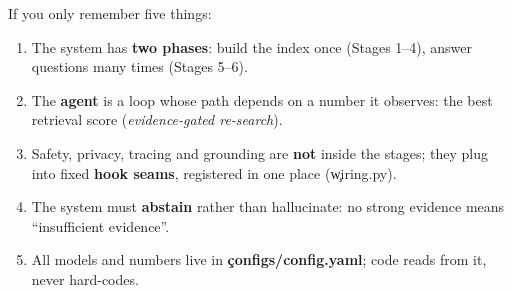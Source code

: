 \begin{keyidea}
If you only remember five things:
\begin{enumerate}
 \item The system has \textbf{two phases}: build the index once (Stages 1--4), answer questions many times (Stages 5--6).
 \item The \textbf{agent} is a loop whose path depends on a number it observes: the best retrieval score (\emph{evidence-gated re-search}).
 \item Safety, privacy, tracing and grounding are \textbf{not} inside the stages; they plug into fixed \textbf{hook seams}, registered in one place (\c{wiring.py}).
 \item The system must \textbf{abstain} rather than hallucinate: no strong evidence means ``insufficient evidence''.
 \item All models and numbers live in \textbf{\c{configs/config.yaml}}; code reads from it, never hard-codes.
\end{enumerate}
\end{keyidea}
